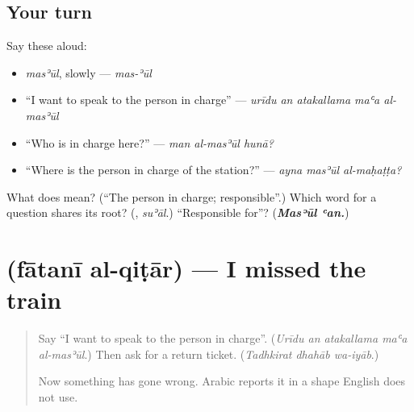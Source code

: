 \subsection*{Your turn}
Say these aloud:

\begin{itemize}
\raggedright
  \item \emph{masʾūl}, slowly — \emph{mas-ʾūl}
  \item \textquotedblleft{}I want to speak to the person in charge\textquotedblright{} — \emph{urīdu an atakallama maʿa al-masʾūl}
  \item \textquotedblleft{}Who is in charge here?\textquotedblright{} — \emph{man al-masʾūl hunā?}
  \item \textquotedblleft{}Where is the person in charge of the station?\textquotedblright{} — \emph{ayna masʾūl al-maḥaṭṭa?}
\end{itemize}

\begin{tcolorbox}[breakable,colback=teal!4,colframe=teal!35!black,title={Before you move on}]
What does  mean? (\textquotedblleft{}The person in charge; responsible\textquotedblright{}.) Which word for a question shares its root? (\textbf{}, \emph{suʾāl}.) \textquotedblleft{}Responsible for\textquotedblright{}? (\emph{\textbf{Masʾūl ʿan.}})
\end{tcolorbox}
\section[\texorpdfstring{\ar{فاتني} \ar{القطار} (fātanī al-qiṭār)}{فاتني القطار (fātanī al-qiṭār)}]{  (fātanī al-qiṭār) — I missed the train}

\label{lesson:AR-C288-fatani}



\begin{quote}
Say \textquotedblleft{}I want to speak to the person in charge\textquotedblright{}. (\emph{Urīdu an atakallama maʿa al-masʾūl}.) Then ask for a return ticket. (\emph{Tadhkirat dhahāb wa-iyāb}.)

Now something has gone wrong. Arabic reports it in a shape English does not use.
\end{quote}


